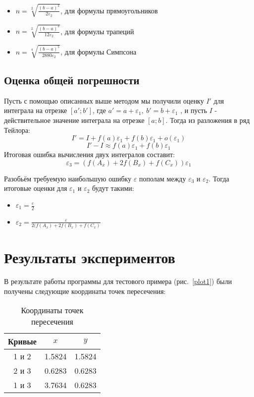 \documentclass[a4paper,12pt,titlepage,finall]{article}
\begin{document}
\begin{itemize}
  \item $ n = \sqrt[2]{\frac{(b-a)^3}{2\varepsilon_2}}$, для формулы прямоугольников

  \item $ n = \sqrt[2]{\frac{(b-a)^3}{12\varepsilon_2}}$, для формулы трапеций

  \item $ n = \sqrt[4]{\frac{(b-a)^5}{2880\varepsilon_2}}$, для формулы Симпсона
\end{itemize}

\subsection{Оценка общей погрешности}
Пусть с помощью описанных выше методом мы получили оценку $I'$ для интеграла
на отрезке $[a';b']$, где 
$a' = a + \varepsilon_1,~b'=b+\varepsilon_1$
, и пусть $I$ - действительное значение интеграла на отрезке $[a;b]$. 
Тогда из разложения в ряд Тейлора:
\[I' = I + f(a)\varepsilon_1 + f(b)\varepsilon_1 + o(\varepsilon_1)\]
\[I' - I \approx f(a)\varepsilon_1 + f(b)\varepsilon_1\]
Итоговая ошибка вычисления двух интегралов составит:
\[\varepsilon_3 = (f(A_x) + 2f(B_x) + f(C_x))\varepsilon_1\]

Разобьём требуемую наибольшую ошибку $\varepsilon$ пополам между $\varepsilon_3$ и $\varepsilon_2$. Тогда итоговые оценки для $\varepsilon_1$ и $\varepsilon_2$ будут такими:
\begin{itemize}
  \item $\varepsilon_1 = \frac{\varepsilon}{2}$

  \item $\varepsilon_2 = \frac{\varepsilon}{2(f(A_x) + 2f(B_x) + f(C_x)}$
\end{itemize}
\newpage

\section{Результаты экспериментов}

В результате работы программы для тестового примера (рис.~\ref{plot1}) были получены следующие координаты точек пересечения:

\begin{table}[h]
\centering
\begin{tabular}{|c|c|c|}
\hline
Кривые & $x$ & $y$ \\
\hline
1 и 2 &  1.5824 & 1.5824 \\
2 и 3 &  0.6283 & 0.6283 \\
1 и 3 &  3.7634 & 0.6283 \\
\hline
\end{tabular}
\caption{Координаты точек пересечения}
\label{table1}
\end{table}
\end{document}
